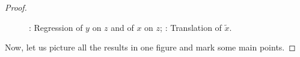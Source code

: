 \documentclass[nobib]{tufte-handout}
\theoremstyle{definition}
\begin{document}
\begin{proof}
\begin{figure}[ht!]
\begin{center}
\hspace{4ex}
\caption{: Regression of $y$ on $z$ and of $x$ on $z$;
: Translation of $\tilde{x}$.}
\end{center}
\end{figure}

Now, let us picture all the results in one figure and mark some main points.


\end{proof}
\end{document}
